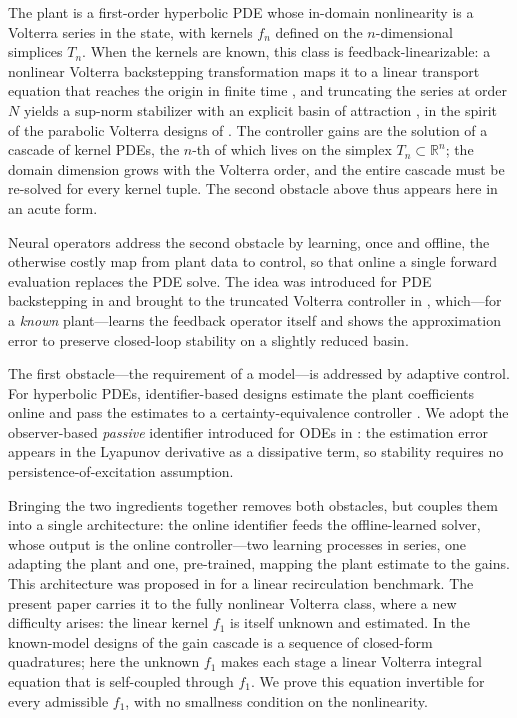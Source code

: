 \documentclass[journal,twoside,web]{ieeecolor}
\begin{document}
The plant is a first-order hyperbolic PDE whose in-domain nonlinearity is a Volterra series in the state, with kernels $f_n$ defined on the $n$-dimensional simplices $T_n$. When the kernels are known, this class is feedback-linearizable: a nonlinear Volterra backstepping transformation maps it to a linear transport equation that reaches the origin in finite time \cite{HV1}, and truncating the series at order $N$ yields a sup-norm stabilizer with an explicit basin of attraction \cite{HV2}, in the spirit of the parabolic Volterra designs of \cite{VK102}. The controller gains are the solution of a cascade of kernel PDEs, the $n$-th of which lives on the simplex $T_n\subset\mathbb{R}^n$; the domain dimension grows with the Volterra order, and the entire cascade must be re-solved for every kernel tuple. The second obstacle above thus appears here in an acute form.

Neural operators \cite{Lu2021Universal} address the second obstacle by learning, once and offline, the otherwise costly map from plant data to control, so that online a single forward evaluation replaces the PDE solve. The idea was introduced for PDE backstepping in \cite{KBS442} and brought to the truncated Volterra controller in \cite{HV3}, which---for a \emph{known} plant---learns the feedback operator itself and shows the approximation error to preserve closed-loop stability on a slightly reduced basin.

The first obstacle---the requirement of a model---is addressed by adaptive control. For hyperbolic PDEs, identifier-based designs estimate the plant coefficients online and pass the estimates to a certainty-equivalence controller \cite{AA19}. We adopt the observer-based \emph{passive} identifier introduced for ODEs in \cite{KK94,KrsticKKK1995}: the estimation error appears in the Lyapunov derivative as a dissipative term, so stability requires no persistence-of-excitation assumption.

Bringing the two ingredients together removes both obstacles, but couples them into a single architecture: the online identifier feeds the offline-learned solver, whose output is the online controller---two learning processes in series, one adapting the plant and one, pre-trained, mapping the plant estimate to the gains. This architecture was proposed in \cite{LBSK} for a linear recirculation benchmark. The present paper carries it to the fully nonlinear Volterra class, where a new difficulty arises: the linear kernel $f_1$ is itself unknown and estimated. In the known-model designs of \cite{HV1,HV2} the gain cascade is a sequence of closed-form quadratures; here the unknown $f_1$ makes each stage a linear Volterra integral equation that is self-coupled through $f_1$. We prove this equation invertible for every admissible $f_1$, with no smallness condition on the nonlinearity.
\end{document}
